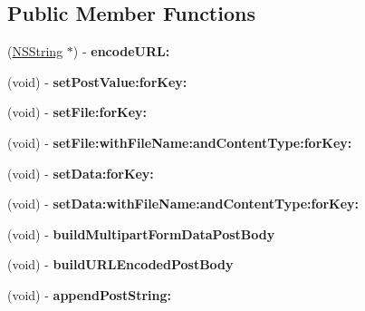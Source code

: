 \subsection*{Public Member Functions}
\begin{DoxyCompactItemize}
\item 
\hypertarget{interface_a_s_i_form_data_request_a817cf8f9da80c83539be0f3c9b8dc868}{
(\hyperlink{class_n_s_string}{NSString} $\ast$) -\/ {\bfseries encodeURL:}}
\label{interface_a_s_i_form_data_request_a817cf8f9da80c83539be0f3c9b8dc868}

\item 
\hypertarget{interface_a_s_i_form_data_request_a90236e7099afbab72bb160029df5a368}{
(void) -\/ {\bfseries setPostValue:forKey:}}
\label{interface_a_s_i_form_data_request_a90236e7099afbab72bb160029df5a368}

\item 
\hypertarget{interface_a_s_i_form_data_request_a8b097474a664290880231fd4439f352e}{
(void) -\/ {\bfseries setFile:forKey:}}
\label{interface_a_s_i_form_data_request_a8b097474a664290880231fd4439f352e}

\item 
\hypertarget{interface_a_s_i_form_data_request_a6367b10ba636657b8a08725ec17e879d}{
(void) -\/ {\bfseries setFile:withFileName:andContentType:forKey:}}
\label{interface_a_s_i_form_data_request_a6367b10ba636657b8a08725ec17e879d}

\item 
\hypertarget{interface_a_s_i_form_data_request_a707a5cef615835146cdbed3ceca31016}{
(void) -\/ {\bfseries setData:forKey:}}
\label{interface_a_s_i_form_data_request_a707a5cef615835146cdbed3ceca31016}

\item 
\hypertarget{interface_a_s_i_form_data_request_abbcca0f83bbe93f0132094a99a274098}{
(void) -\/ {\bfseries setData:withFileName:andContentType:forKey:}}
\label{interface_a_s_i_form_data_request_abbcca0f83bbe93f0132094a99a274098}

\item 
\hypertarget{interface_a_s_i_form_data_request_a55154abc422c9c4497599337ebc1c932}{
(void) -\/ {\bfseries buildMultipartFormDataPostBody}}
\label{interface_a_s_i_form_data_request_a55154abc422c9c4497599337ebc1c932}

\item 
\hypertarget{interface_a_s_i_form_data_request_a2927a87a8bfc64e29f5df6f0ea4792b7}{
(void) -\/ {\bfseries buildURLEncodedPostBody}}
\label{interface_a_s_i_form_data_request_a2927a87a8bfc64e29f5df6f0ea4792b7}

\item 
\hypertarget{interface_a_s_i_form_data_request_a1e91db0b76ca2a2129a597f65fae0c79}{
(void) -\/ {\bfseries appendPostString:}}
\label{interface_a_s_i_form_data_request_a1e91db0b76ca2a2129a597f65fae0c79}

\end{DoxyCompactItemize}
